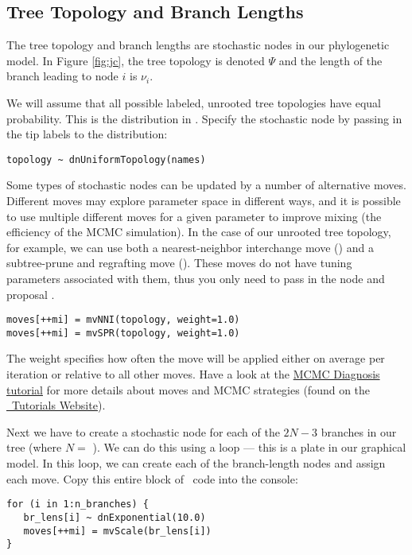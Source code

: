\bigskip
\subsection{Tree Topology and Branch Lengths}

The tree topology and branch lengths are stochastic nodes in our phylogenetic model. 
In Figure \ref{fig:jc}, the tree topology is denoted $\Psi$ and the length of the branch leading to node $i$ is $\nu_i$.

We will assume that all possible labeled, unrooted tree topologies have equal probability. This is the  distribution in \RevBayes. Specify the  stochastic node by passing in the tip labels  to the  distribution:
{\tt \begin{snugshade*}
\begin{lstlisting}
topology ~ dnUniformTopology(names)
\end{lstlisting}
\end{snugshade*}}

Some types of stochastic nodes can be updated by a number of alternative moves. 
Different moves may explore parameter space in different ways, and it is possible to use multiple different moves for a given parameter to improve mixing (the efficiency of the MCMC simulation). 
In the case of our unrooted tree topology, for example, we can use both a nearest-neighbor interchange move () and a subtree-prune and regrafting move (). 
These moves do not have tuning parameters associated with them, thus you only need to pass in the  node and proposal . 
{\tt \begin{snugshade*}
\begin{lstlisting}
moves[++mi] = mvNNI(topology, weight=1.0)
moves[++mi] = mvSPR(topology, weight=1.0)
\end{lstlisting}
\end{snugshade*}}
The weight specifies how often the move will be applied either on average per iteration or relative to all other moves.
Have a look at the \href{https://github.com/revbayes/revbayes_tutorial/raw/master/tutorial_TeX/RB_MCMC_Tutorial/RB_MCMC_Tutorial.pdf}{MCMC Diagnosis tutorial} for more details about moves and MCMC strategies (found on the \href{http://revbayes.github.io/tutorials.html}{\RevBayes~Tutorials Website}).


Next we have to create a stochastic node for each of the $2N-3$ branches in our tree (where $N=$ ). 
We can do this using a  loop --- this is a plate in our graphical model. In this loop, we can create each of the branch-length nodes and assign each move. 
Copy this entire block of \Rev~code into the console:
{\tt \small \begin{snugshade*}
\begin{lstlisting}
for (i in 1:n_branches) {
   br_lens[i] ~ dnExponential(10.0)
   moves[++mi] = mvScale(br_lens[i]) 
}
\end{lstlisting}
\end{snugshade*}}

